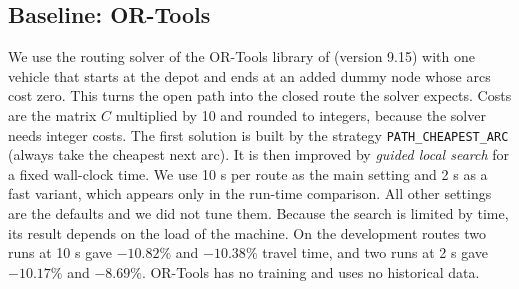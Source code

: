 \documentclass[11pt,a4paper]{article}
\newcommand{\mention}[1]{\citeauthor*{#1}}
\begin{document}
\subsection{Baseline: OR-Tools}\label{sec:ortools}
We use the routing solver of the OR-Tools library of \mention{ortools} (version 9.15) with one vehicle that starts at the depot and ends at an added dummy node whose arcs cost zero. This turns the open path into the closed route the solver expects. Costs are the matrix $C$ multiplied by 10 and rounded to integers, because the solver needs integer costs. The first solution is built by the strategy \texttt{PATH\_CHEAPEST\_ARC} (always take the cheapest next arc). It is then improved by \emph{guided local search} for a fixed wall-clock time. We use 10 s per route as the main setting and 2 s as a fast variant, which appears only in the run-time comparison. All other settings are the defaults and we did not tune them. Because the search is limited by time, its result depends on the load of the machine. On the development routes two runs at 10 s gave $-10.82\%$ and $-10.38\%$ travel time, and two runs at 2 s gave $-10.17\%$ and $-8.69\%$. OR-Tools has no training and uses no historical data.
\end{document}
